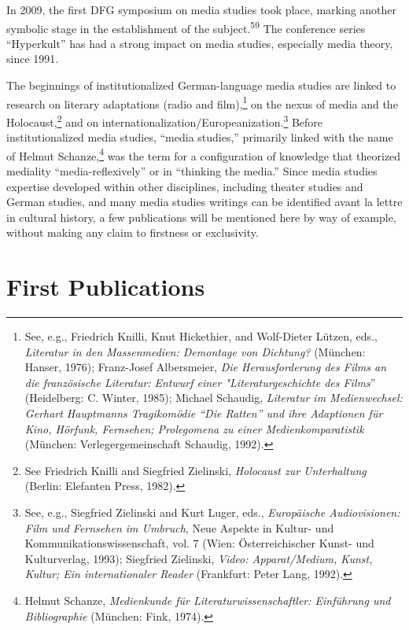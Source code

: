 \documentclass{tufte-handout}
\begin{document}
In 2009, the first DFG symposium on media studies took place, marking
another symbolic stage in the establishment of the subject.\textsuperscript{59} The
conference series ``Hyperkult'' has had a strong impact on media
studies, especially media theory, since 1991.

\newpage The beginnings of institutionalized German-language media studies are
linked to research on literary adaptations (radio and film),\footnote{See,
  e.g., Friedrich Knilli, Knut Hickethier, and Wolf-Dieter Lützen, eds.,
  \emph{Literatur in den Massenmedien: Demontage von Dichtung?}
  (München: Hanser, 1976); Franz-Josef Albersmeier, \emph{Die
  Herausforderung des Films an die französische Literatur:}
  \emph{Entwurf einer "Literaturgeschichte des Films}'' (Heidelberg: C.
  Winter, 1985); Michael Schaudig, \emph{Literatur im Medienwechsel:
  Gerhart Hauptmanns Tragikomödie ``Die Ratten'' und ihre Adaptionen für
  Kino, Hörfunk, Fernsehen; Prolegomena zu einer Medienkomparatistik}
  (München: Verlegergemeinschaft Schaudig, 1992).} on the nexus of media
and the Holocaust,\footnote{See Friedrich Knilli and Siegfried
  Zielinski, \emph{Holocaust zur Unterhaltung} (Berlin: Elefanten Press,
  1982).} and on internationalization/Europeanization.\footnote{See,
  e.g., Siegfried Zielinski and Kurt Luger, eds., \emph{Europäische
  Audiovisionen: Film und Fernsehen im Umbruch}, Neue Aspekte in Kultur-
  und Kommunikationswissenschaft, vol. 7 (Wien: Österreichischer Kunst-
  und Kulturverlag, 1993); Siegfried Zielinski, \emph{Video:
  Apparat/Medium, Kunst, Kultur; Ein internationaler Reader} (Frankfurt:
  Peter Lang, 1992).} Before institutionalized media studies, ``media
studies,'' primarily linked with the name of Helmut Schanze,\footnote{Helmut
  Schanze, \emph{Medienkunde für Literaturwissenschaftler: Einführung
  und Bibliographie} (München: Fink, 1974).} was the term for a
configuration of knowledge that theorized mediality
``media-reflexively'' or in ``thinking the media.'' Since media studies
expertise developed within other disciplines, including theater studies
and German studies, and many media studies writings can be identified
avant la lettre in cultural history, a few publications will be
mentioned here by way of example, without making any claim to firstness
or exclusivity.

\hypertarget{first-publications}{%
\section{First Publications}\label{first-publications}}
\end{document}
